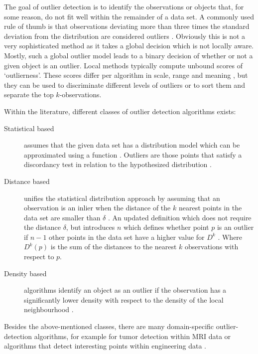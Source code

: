 The goal of outlier detection is to identify the observations or objects that, for some reason, do not fit well within the remainder of a data set. A commonly used rule of thumb is that observations deviating more than three times the standard deviation from the distribution are considered outliers \cite{9783540262565}. Obviously this is not a very sophisticated method as it takes a global decision which is not locally aware. Mostly, such a global outlier model leads to a binary decision of whether or not a given object is an outlier. Local methods typically compute unbound scores of `outlierness'. These scores differ per algorithm in scale, range and meaning \cite{4053049}, but they can be used to discriminate different levels of outliers or to sort them and separate the top $k$-observations.


Within the literature, different classes of outlier detection algorithms exists:
\begin{description}
 \item[Statistical based] assumes that the given data set has a distribution model which can be approximated using a function \cite{Hadi2009}. Outliers are those points that satisfy a discordancy test in relation to the hypothesized distribution \cite{barnett1994outliers}. 
 \item[Distance based] unifies the statistical distribution approach \cite{Knorr:1997:UAM:782010.782021} by assuming that an observation is an inlier when the distance of the $k$ nearest points in the data set are smaller than $\delta$ \cite{Knorr98algorithmsfor}. An updated definition which does not require the distance $\delta$, but introduces $n$ which defines whether point $p$ is an outlier if $n-1$ other points in the data set have a higher value for $D^{k}$ \cite{Ramaswamy:2000:EAM:335191.335437}. Where $D^{k}(p)$ is the sum of the distances to the nearest $k$ observations with respect to $p$.
 \item[Density based] algorithms identify an object as an outlier if the observation has a significantly lower density with respect to the density of the local neighbourhood \cite{Breunig:2000:LID:335191.335388,Breunig:2000:LID:342009.335388}.
\end{description}
Besides the above-mentioned classes, there are many domain-specific outlier-detection algorithms, for example for tumor detection within MRI data \cite{991693} or algorithms that detect interesting points within engineering data \cite{rog}.

